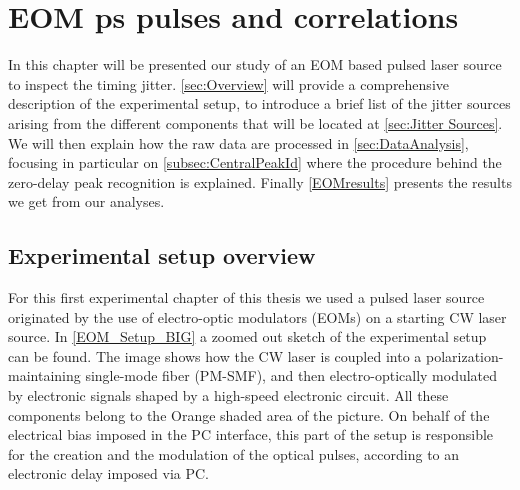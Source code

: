 \chapter{EOM ps pulses and correlations}
In this chapter will be presented our study of an EOM based pulsed laser source to inspect the timing jitter.
\autoref{sec:Overview} will provide a comprehensive description of the experimental setup, to introduce a brief list of the jitter sources arising from the different components that will be located at \autoref{sec:Jitter Sources}.
We will then explain how the raw data are processed in \autoref{sec:DataAnalysis}, focusing in particular on \autoref{subsec:CentralPeakId} where the procedure behind the zero-delay peak recognition is explained.
Finally \autoref{EOMresults} presents the results we get from our analyses.


\section{Experimental setup overview}
\label{sec:Overview}

For this first experimental chapter of this thesis we used a pulsed laser source originated by the use of electro-optic modulators (EOMs) on a starting CW laser source.
In \autoref{EOM_Setup_BIG} a zoomed out sketch of the experimental setup can be found. The image shows how the CW laser is coupled into a polarization-maintaining single-mode fiber (PM-SMF), and then electro-optically modulated by electronic signals shaped by a high-speed electronic circuit. All these components belong to the Orange shaded area of the picture.
On behalf of the electrical bias imposed in the PC interface, this part of the setup is responsible for the creation and the modulation of the optical pulses, according to an electronic delay imposed via PC.

